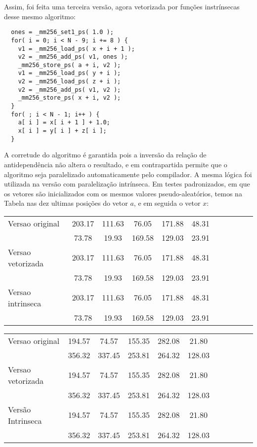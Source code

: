 \documentclass[conference]{IEEEtran}
\begin{document}
Assim, foi feita uma terceira versão, agora vetorizada por funções instrínsecas desse mesmo algoritmo:

\begin{lstlisting}
  ones = _mm256_set1_ps( 1.0 );
  for( i = 0; i < N - 9; i += 8 ) {
    v1 = _mm256_load_ps( x + i + 1 );
    v2 = _mm256_add_ps( v1, ones );
    _mm256_store_ps( a + i, v2 );
    v1 = _mm256_load_ps( y + i );
    v2 = _mm256_load_ps( z + i );
    v2 = _mm256_add_ps( v1, v2 );
    _mm256_store_ps( x + i, v2 );
  }
  for( ; i < N - 1; i++ ) {
    a[ i ] = x[ i + 1 ] + 1.0;
    x[ i ] = y[ i ] + z[ i ];
  }
\end{lstlisting}

A corretude do algoritmo é garantida pois a inversão da relação de antidependência não altera o resultado, e em contrapartida permite que o algoritmo seja paralelizado automaticamente pelo compilador. A mesma lógica foi utilizada na versão com paralelização intrínseca. Em testes padronizados, em que os vetores são inicializados com os mesmos valores pseudo-aleatórios, temos na Tabela  nas dez ultimas posições do vetor $a$, e em seguida o vetor $x$: %


\begin{table}[htb!]
\centering
\begin{tabular}{l c c c c c c c c c c }
  Versao original & 203.17 & 111.63 & 76.05 & 171.88 & 48.31 \\
  & 73.78 & 19.93 & 169.58 & 129.03 & 23.91 \\
  Versao vetorizada & 203.17 & 111.63 & 76.05 & 171.88 & 48.31 \\
  & 73.78 & 19.93 & 169.58 & 129.03 & 23.91 \\
  Versao intrinseca & 203.17 & 111.63 & 76.05 & 171.88 & 48.31 \\
  & 73.78 & 19.93 & 169.58 & 129.03 & 23.91
\end{tabular}
\label{tab:exp2.testea}
\end{table}


\begin{table}[htb!]
\centering
\begin{tabular}{ l c c c c c c c c c c }
  Versao original & 194.57 & 74.57 & 155.35 & 282.08 & 21.80\\
  & 356.32 & 337.45 & 253.81 & 264.32 & 128.03 \\
  Versao vetorizada & 194.57 & 74.57 & 155.35 & 282.08 & 21.80\\
  & 356.32 & 337.45 & 253.81 & 264.32 & 128.03 \\
  Versão Intrinseca & 194.57 & 74.57 & 155.35 & 282.08 & 21.80\\
  & 356.32 & 337.45 & 253.81 & 264.32 & 128.03
\end{tabular}
\label{tab:exp2.testeb}
\end{table}
\end{document}

